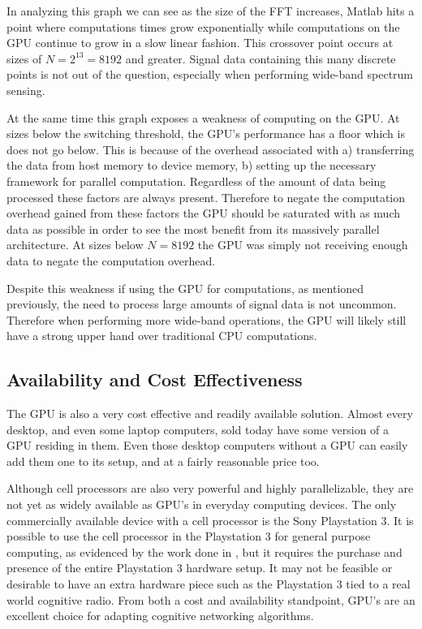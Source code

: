 In analyzing this graph we can see as the size of the FFT increases, Matlab hits a point where computations times grow exponentially while computations on the GPU continue to grow in a slow linear fashion.  This crossover point occurs at sizes of $N = 2^13 = 8192$ and greater.  Signal data containing this many discrete points is not out of the question, especially when performing wide-band spectrum sensing.  

At the same time this graph exposes a weakness of computing on the GPU.  At sizes below the switching threshold, the GPU's performance has a floor which is does not go below.  This is because of the overhead associated with a) transferring the data from host memory to device memory, b) setting up the necessary framework for parallel computation.  Regardless of the amount of data being processed these factors are always present. Therefore to negate the computation overhead gained from these factors the GPU should be saturated with as much data as possible in order to see the most benefit from its massively parallel architecture.  At sizes below $N = 8192$ the GPU was simply not receiving enough data to negate the computation overhead.

Despite this weakness if using the GPU for computations, as mentioned previously, the need to process large amounts of signal data is not uncommon.  Therefore when performing more wide-band operations, the GPU will likely still have a strong upper hand over traditional CPU computations.

\subsection{Availability and Cost Effectiveness}
The GPU is also a very cost effective and readily available solution.  Almost every desktop, and even some laptop computers, sold today have some version of a GPU residing in them.  Even those desktop computers without a GPU can easily add them one to its setup, and at a fairly reasonable price too.  

Although cell processors are also very powerful and highly parallelizable, they are not yet as widely available as GPU's in everyday computing devices.  The only commercially available device with a cell processor is the Sony Playstation 3.  It is possible to use the cell processor in the Playstation 3 for general purpose computing, as evidenced by the work done in \cite{FenChenWan08}, but it requires the purchase and presence of the entire Playstation 3 hardware setup.  It may not be feasible or desirable to have an extra hardware piece such as the Playstation 3 tied to a real world cognitive radio.  From both a cost and availability standpoint, GPU's are an excellent choice for adapting cognitive networking algorithms.


